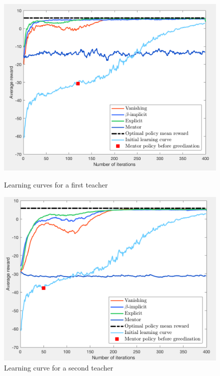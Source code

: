\documentclass[a4paper]{report}
\begin{document}
{{{{				\begin{figure}[ht!]
					\begin{minipage}{0.5\linewidth}
						\includegraphics[width=\linewidth]{fullcomp_subopt_120}
						\caption{Learning curves for a first teacher}
						\label{fig::compliant_comp_120}
					\end{minipage}
					\begin{minipage}{0.5\linewidth}
						\includegraphics[width=\linewidth]{fullcomp_subopt_50}
						\caption{Learning curve for a second teacher}
						\label{fig::compliant_comp_50}
					\end{minipage}
				\end{figure}
				
}}}}
\end{document}
